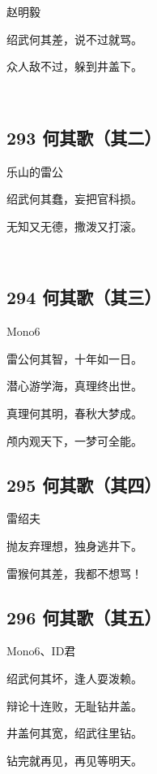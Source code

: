 {赵明毅}

绍武何其差，说不过就骂。

众人敌不过，躲到井盖下。

~\\

\hypertarget{ux4f55ux5176ux6b4cux5176ux4e8c}{%
\subsection{293 何其歌（其二）}\label{ux4f55ux5176ux6b4cux5176ux4e8c}}

{乐山的雷公}

绍武何其蠢，妄把官科损。

无知又无德，撒泼又打滚。

~\\

\hypertarget{ux4f55ux5176ux6b4cux5176ux4e09}{%
\subsection{294 何其歌（其三）}\label{ux4f55ux5176ux6b4cux5176ux4e09}}

{Mono6}

雷公何其智，十年如一日。

潜心游学海，真理终出世。

真理何其明，春秋大梦成。

颅内观天下，一梦可全能。

\hypertarget{ux4f55ux5176ux6b4cux5176ux56db}{%
\subsection{295 何其歌（其四）}\label{ux4f55ux5176ux6b4cux5176ux56db}}

{雷绍夫}

抛友弃理想，独身逃井下。

雷猴何其差，我都不想骂！

\hypertarget{ux4f55ux5176ux6b4cux5176ux4e94}{%
\subsection{296 何其歌（其五）}\label{ux4f55ux5176ux6b4cux5176ux4e94}}

{Mono6、ID君}

绍武何其坏，逢人耍泼赖。

辩论十连败，无耻钻井盖。

井盖何其宽，绍武往里钻。

钻完就再见，再见等明天。


